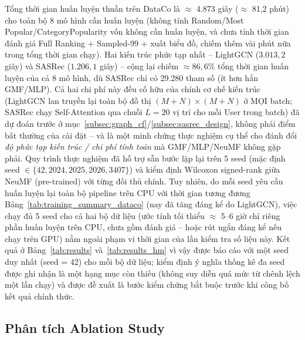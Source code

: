 Tổng thời gian huấn luyện thuần trên DataCo là $\approx$ 4.873 giây ($\approx$ 81,2 phút) cho toàn bộ 8 mô hình cần huấn luyện (không tính Random/Most Popular/CategoryPopularity vốn không cần huấn luyện, và chưa tính thời gian đánh giá Full Ranking + Sampled-99 + xuất biểu đồ, chiếm thêm vài phút nữa trong tổng thời gian chạy). Hai kiến trúc phức tạp nhất -- LightGCN ($3.013,2$ giây) và SASRec ($1.206,1$ giây) -- cộng lại chiếm $\approx 86,6\%$ tổng thời gian huấn luyện của cả 8 mô hình, dù SASRec chỉ có 29.280 tham số (ít hơn hẳn GMF/MLP). Cả hai chi phí này đều cố hữu của chính cơ chế kiến trúc (LightGCN lan truyền lại toàn bộ đồ thị $(M{+}N){\times}(M{+}N)$ ở MỌI batch; SASRec chạy Self-Attention qua chuỗi $L{=}20$ vị trí cho mỗi User trong batch) đã dự đoán trước ở mục~\ref{subsec:graph_cf}/\ref{subsec:sasrec_design}, không phải điểm bất thường của cài đặt -- và là một minh chứng thực nghiệm cụ thể cho đánh đổi \emph{độ phức tạp kiến trúc / chi phí tính toán} mà GMF/MLP/NeuMF không gặp phải. Quy trình thực nghiệm đã hỗ trợ sẵn bước lặp lại trên 5 seed (mặc định seed $\in \{42, 2024, 2025, 2026, 3407\}$) và kiểm định Wilcoxon signed-rank giữa NeuMF (pre-trained) với từng đối thủ chính. Tuy nhiên, do mỗi seed yêu cầu huấn luyện lại toàn bộ pipeline trên CPU với thời gian tương đương Bảng~\ref{tab:training_summary_dataco} (nay đã tăng đáng kể do LightGCN), việc chạy đủ 5 seed cho cả hai bộ dữ liệu (ước tính tối thiểu $\approx$ 5--6 giờ chỉ riêng phần huấn luyện trên CPU, chưa gồm đánh giá -- hoặc rút ngắn đáng kể nếu chạy trên GPU) nằm ngoài phạm vi thời gian của lần kiểm tra số liệu này. Kết quả ở Bảng~\ref{tab:results} và~\ref{tab:results_hm} vì vậy được báo cáo với một seed duy nhất (seed = 42) cho mỗi bộ dữ liệu; kiểm định ý nghĩa thống kê đa seed được ghi nhận là một hạng mục còn thiếu (không suy diễn quá mức từ chênh lệch một lần chạy) và được đề xuất là bước kiểm chứng bắt buộc trước khi công bố kết quả chính thức.

\subsection{Phân tích Ablation Study}
\label{subsec:ablation}

